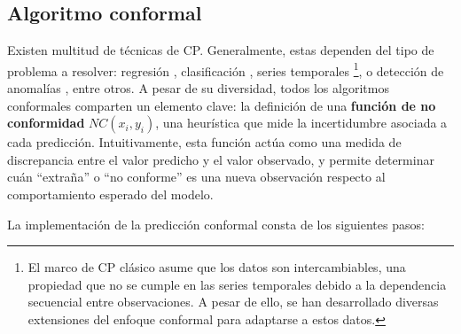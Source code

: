 



\subsection{Algoritmo conformal}

Existen multitud de técnicas de \acrshort{CP}. Generalmente, estas dependen del tipo de problema a resolver: regresión \cite{papadopoulos2002, romano2019, bethell2024}, clasificación \cite{sadinle2019, romano2020, angelopoulos2020}, series temporales \cite{xu2021, zaffran2022, stankeviciute2021}%
\footnote{
    El marco de \acrshort{CP} clásico asume que los datos son intercambiables, una propiedad que no se cumple en las series temporales debido a la dependencia secuencial entre observaciones. A pesar de ello, se han desarrollado diversas extensiones del enfoque conformal para adaptarse a estos datos.
},
o detección de anomalías \cite{laxhammar2015}, entre otros. 
A pesar de su diversidad, todos los algoritmos conformales comparten un elemento clave: la definición de una 
\textbf{función de no conformidad} $NC(x_i,y_i)$, una heurística que mide la incertidumbre asociada a cada predicción. Intuitivamente, esta función actúa como una medida de discrepancia entre el valor predicho y el valor observado, y permite determinar cuán ``extraña'' o ``no conforme'' es una nueva observación respecto al comportamiento esperado del modelo.

La implementación de la predicción conformal consta de los siguientes pasos:

